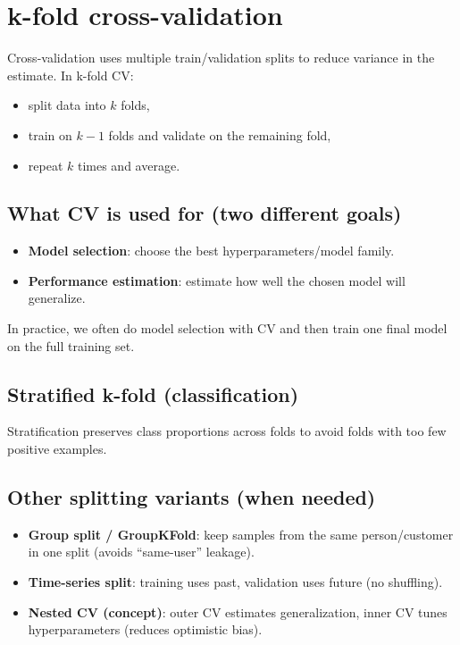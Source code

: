\documentclass[11pt]{article}
\begin{document}
\section{k-fold cross-validation}
Cross-validation uses multiple train/validation splits to reduce variance in the estimate.
In k-fold CV:
\begin{itemize}[leftmargin=*]
  \item split data into $k$ folds,
  \item train on $k-1$ folds and validate on the remaining fold,
  \item repeat $k$ times and average.
\end{itemize}

\subsection{What CV is used for (two different goals)}
\begin{itemize}[leftmargin=*]
  \item \textbf{Model selection}: choose the best hyperparameters/model family.
  \item \textbf{Performance estimation}: estimate how well the chosen model will generalize.
\end{itemize}
In practice, we often do model selection with CV and then train one final model on the full training set.

\subsection{Stratified k-fold (classification)}
Stratification preserves class proportions across folds to avoid folds with too few positive examples.

\subsection{Other splitting variants (when needed)}
\begin{itemize}[leftmargin=*]
  \item \textbf{Group split / GroupKFold}: keep samples from the same person/customer in one split (avoids ``same-user'' leakage).
  \item \textbf{Time-series split}: training uses past, validation uses future (no shuffling).
  \item \textbf{Nested CV (concept)}: outer CV estimates generalization, inner CV tunes hyperparameters (reduces optimistic bias).
\end{itemize}
\end{document}
